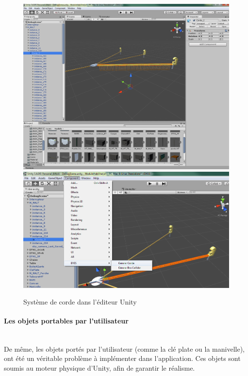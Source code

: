 \documentclass[a4paper]{article}
\begin{document}
    \begin{figure}[H]
        \centering
        \includegraphics[scale=0.25]{img/CordeUnity}
        \includegraphics[scale=0.35]{img/GenererCorde}
        \caption{Système de corde dans l'éditeur Unity}
    \end{figure}

    \newpage

    \paragraph{Les objets portables par l'utilisateur} \mbox{} \\

    De même, les objets portés par l'utilisateur (comme la clé plate ou la manivelle), ont été un véritable problème à implémenter dans l'application. Ces objets sont soumis au moteur physique d'Unity, afin de garantir le réalisme. \\
\end{document}
